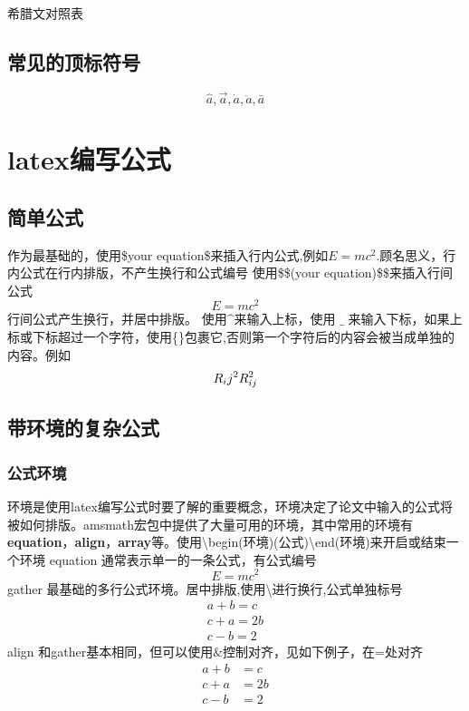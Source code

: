 \documentclass[UTF8]{ctexart}
\begin{document}
\begin{table}[H]
    \centering
    \caption{希腊文对照表}
    \label{希腊文对照表}
\end{table}


\subsection{常见的顶标符号}
\begin{equation}
 \hat{a},\vec{a},\dot{a},\ddot{a},\bar{a}
\end{equation}

\newpage
\section{latex编写公式}

\subsection{简单公式}
作为最基础的，使用\$your equation\$来插入行内公式,例如$E=mc^2$.顾名思义，行内公式在行内排版，不产生换行和公式编号
使用\$\$(your equation)\$\$来插入行间公式
$$
E=mc^2
$$
行间公式产生换行，并居中排版。
使用$\^{}$来输入上标，使用 $\_{}$ 来输入下标，如果上标或下标超过一个字符，使用\{\}包裹它,否则第一个字符后的内容会被当成单独的内容。例如
$$
R_ij^2\\
R_{ij}^2
$$

\subsection{带环境的复杂公式}

\subsubsection{公式环境}
环境是使用latex编写公式时要了解的重要概念，环境决定了论文中输入的公式将被如何排版。amsmath宏包中提供了大量可用的环境，其中常用的环境有\textbf{equation}，\textbf{align}，\textbf{array}等。使用\textbackslash begin{(环境)}(公式)\textbackslash end{(环境)}来开启或结束一个环境
equation 通常表示单一的一条公式，有公式编号
\begin{equation}
  E=mc^2
\end{equation}
gather 最基础的多行公式环境。居中排版,使用\textbackslash 进行换行,公式单独标号
\begin{gather}
  a+b=c\\
  c+a=2b\\
  c-b=2
\end{gather}
align 和gather基本相同，但可以使用$\&$控制对齐，见如下例子，在=处对齐
$$
\begin{aligned}
    a+b&=c\\
  c+a&=2b\\
  c-b&=2
\end{aligned}
$$
\end{document}
